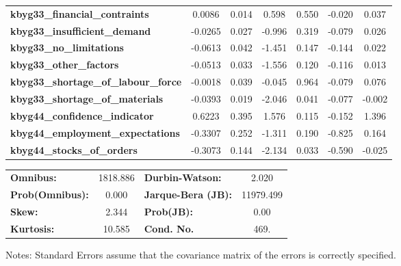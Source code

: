 \begin{center}
\begin{tabular}{lcccccc}
\textbf{kbyg33\_financial\_contraints}       &       0.0086  &        0.014     &     0.598  &         0.550        &       -0.020    &        0.037     \\
\textbf{kbyg33\_insufficient\_demand}        &      -0.0265  &        0.027     &    -0.996  &         0.319        &       -0.079    &        0.026     \\
\textbf{kbyg33\_no\_limitations}             &      -0.0613  &        0.042     &    -1.451  &         0.147        &       -0.144    &        0.022     \\
\textbf{kbyg33\_other\_factors}              &      -0.0513  &        0.033     &    -1.556  &         0.120        &       -0.116    &        0.013     \\
\textbf{kbyg33\_shortage\_of\_labour\_force} &      -0.0018  &        0.039     &    -0.045  &         0.964        &       -0.079    &        0.076     \\
\textbf{kbyg33\_shortage\_of\_materials}     &      -0.0393  &        0.019     &    -2.046  &         0.041        &       -0.077    &       -0.002     \\
\textbf{kbyg44\_confidence\_indicator}       &       0.6223  &        0.395     &     1.576  &         0.115        &       -0.152    &        1.396     \\
\textbf{kbyg44\_employment\_expectations}    &      -0.3307  &        0.252     &    -1.311  &         0.190        &       -0.825    &        0.164     \\
\textbf{kbyg44\_stocks\_of\_orders}          &      -0.3073  &        0.144     &    -2.134  &         0.033        &       -0.590    &       -0.025     \\
\bottomrule
\end{tabular}
\begin{tabular}{lclc}
\textbf{Omnibus:}       & 1818.886 & \textbf{  Durbin-Watson:     } &     2.020  \\
\textbf{Prob(Omnibus):} &   0.000  & \textbf{  Jarque-Bera (JB):  } & 11979.499  \\
\textbf{Skew:}          &   2.344  & \textbf{  Prob(JB):          } &      0.00  \\
\textbf{Kurtosis:}      &  10.585  & \textbf{  Cond. No.          } &      469.  \\
\bottomrule
\end{tabular}
\end{center}

Notes: \newline
 [1] Standard Errors assume that the covariance matrix of the errors is correctly specified.